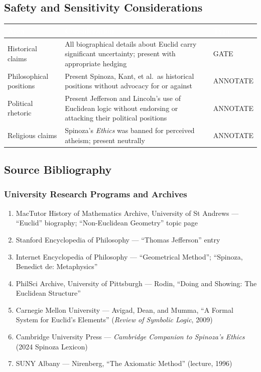 \documentclass[11pt,letterpaper]{article}
\newcommand{\tableheader}[1]{\textbf{\sffamily\textcolor{white}{#1}}}
\begin{document}
\subsection{Safety and Sensitivity Considerations}

\begin{center}
\begin{tabularx}{\textwidth}{L{3cm}XC{2cm}}
\toprule
{}
\tableheader{Area} & \tableheader{Consideration} & \tableheader{Type} \\
\midrule
Historical claims & All biographical details about Euclid carry significant uncertainty; present with appropriate hedging & GATE \\
Philosophical positions & Present Spinoza, Kant, et al.\ as historical positions without advocacy for or against & ANNOTATE \\
Political rhetoric & Present Jefferson and Lincoln's use of Euclidean logic without endorsing or attacking their political positions & ANNOTATE \\
Religious claims & Spinoza's \textit{Ethics} was banned for perceived atheism; present neutrally & ANNOTATE \\
\bottomrule
\end{tabularx}
\end{center}

\subsection{Source Bibliography}

\subsubsection{University Research Programs and Archives}

\begin{enumerate}[leftmargin=2em]
  \item MacTutor History of Mathematics Archive, University of St Andrews --- ``Euclid'' biography; ``Non-Euclidean Geometry'' topic page
  \item Stanford Encyclopedia of Philosophy --- ``Thomas Jefferson'' entry
  \item Internet Encyclopedia of Philosophy --- ``Geometrical Method''; ``Spinoza, Benedict de: Metaphysics''
  \item PhilSci Archive, University of Pittsburgh --- Rodin, ``Doing and Showing: The Euclidean Structure''
  \item Carnegie Mellon University --- Avigad, Dean, and Mumma, ``A Formal System for Euclid's Elements'' (\textit{Review of Symbolic Logic}, 2009)
  \item Cambridge University Press --- \textit{Cambridge Companion to Spinoza's Ethics} (2024 Spinoza Lexicon)
  \item SUNY Albany --- Nirenberg, ``The Axiomatic Method'' (lecture, 1996)
\end{enumerate}
\end{document}
